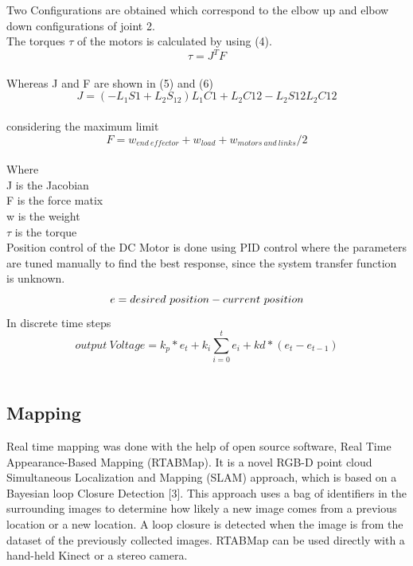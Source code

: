 \documentclass[conference]{IEEEtran}
\begin{document}
Two Configurations are obtained which correspond to the elbow up and elbow down configurations of joint 2.\\
The torques $\tau$ of the motors is calculated by using (4).\\
\begin{equation} \label{eq:4}
\tau=J^TF
\end{equation}\\
Whereas J and F are shown in (5) and (6)
\begin{equation} \label{eq:5}
J=(-L_1S1+L_2S_12)L_1C1+L_2C12-L_2S12L_2C12
\end{equation}\\
considering the maximum limit
\begin{equation} \label{eq:6}
F=w_{end\ effector}+w_{load}+w_{motors\ and\ links}/2
\end{equation}\\

Where\\
J is the Jacobian\\
F is the force matix\\
w is the weight \\
$\tau$ is the torque\\
Position control of the DC Motor is done using PID control where the parameters are tuned manually to find the best response, since the system transfer function is unknown.\\
\begin{equation} \label{eq:7}
e= desired\ position- current\ position\\
\end{equation}
In discrete time steps\\
\begin{equation} \label{eq:8}
output\ Voltage=k_p*e_t+k_i\sum_{i=0}^{t}e_i+kd*(e_t-e_{t-1})
\end{equation}\\
\subsection{Mapping}
Real time mapping was done with the help of open source software, Real Time Appearance-Based Mapping (RTABMap). It is a novel RGB-D point cloud Simultaneous Localization and Mapping (SLAM) approach, which is based on a Bayesian loop Closure Detection [3]. This approach uses a bag of identifiers in the surrounding images to determine how likely a new image comes from a previous location or a new location. A loop closure is detected when the image is from the dataset of the previously collected images. RTABMap can be used directly with a hand-held Kinect or a stereo camera.
\end{document}
